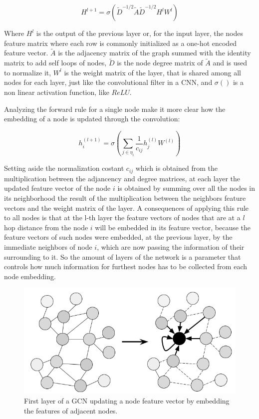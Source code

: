 \documentclass[%
    corpo=13.5pt,
    twoside,
    oldstyle,
    tipotesi=magistrale,
    greek,
    evenboxes
]{toptesi}
\begin{document}
\begin{equation}
H^{l+1}=\sigma(\tilde{D}^{-1/2}\tilde{A}\tilde{D}^{-1/2}H^lW^l)
\end{equation}

Where $H^{l}$ is the output of the previous layer or, for the input layer, the
nodes feature matrix where each row is commonly initialized
as a one-hot encoded feature vector. $\tilde{A}$ is the adjacency matrix
of the graph summed with the identity matrix to add self loops of nodes,
$\tilde{D}$ is the node degree matrix of $\tilde{A}$ and is used to
normalize it, $W^l$ is the weight matrix of the layer, that is shared
among all nodes for each layer, just like the convolutional filter in a CNN,
and $\sigma()$ is a non linear activation function, like $ReLU$.

Analyzing the forward rule for a single node make it more clear how the
embedding of a node is updated through the convolution:

\begin{equation}
    h^{(l+1)}_{i}=\sigma(\sum_{j\in\eta_{i}} \frac{1}{c_{ij}}h_j^{(l)}W^{{(l)}})
\end{equation}

Setting aside the normalization costant $c_{ij}$ which is obtained from the
multiplication between the adjancency and degree matrices, at each layer the
updated feature vector of the node $i$ is obtained by summing over all the
nodes in its neighborhood the result of the multiplication between the
neighbors feature vectors and the weight matrix of the layer.
A consequences of applying this rule to all nodes is that at the l-th layer
the feature vectors of nodes that are at a $l$ hop distance from the node $i$
will be embedded in its feature vector, because the feature vectors of such
nodes were embedded, at the previous layer, by the immediate neighbors of
node $i$, which are now passing the information of their surrounding to it.
So the amount of layers of the network is a parameter that controls how much
information for furthest nodes has to be collected from each node embedding.

\begin{figure}[h]
    \centering
    \includegraphics[scale=0.4]{img/gcn.png}
    \caption{First layer of a GCN updating a node feature vector by embedding
        the features of adjacent nodes.}
    \label{fig:gcn}
\end{figure}
\end{document}
